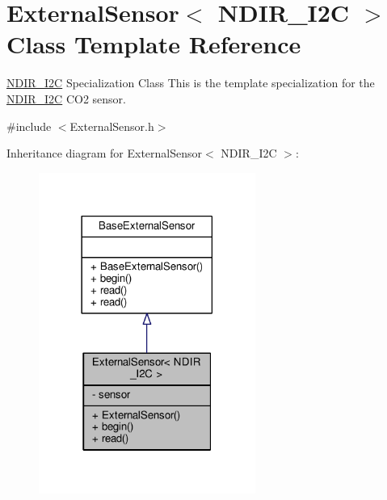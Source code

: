 \hypertarget{class_external_sensor_3_01_n_d_i_r___i2_c_01_4}{}\section{External\+Sensor$<$ N\+D\+I\+R\+\_\+\+I2C $>$ Class Template Reference}
\label{class_external_sensor_3_01_n_d_i_r___i2_c_01_4}


\hyperlink{class_n_d_i_r___i2_c}{N\+D\+I\+R\+\_\+\+I2C} Specialization Class This is the template specialization for the \hyperlink{class_n_d_i_r___i2_c}{N\+D\+I\+R\+\_\+\+I2C} C\+O2 sensor.  




{\ttfamily \#include $<$External\+Sensor.\+h$>$}



Inheritance diagram for External\+Sensor$<$ N\+D\+I\+R\+\_\+\+I2C $>$\+:
\nopagebreak
\begin{figure}[H]
\begin{center}
\leavevmode
\includegraphics[width=201pt]{class_external_sensor_3_01_n_d_i_r___i2_c_01_4__inherit__graph}
\end{center}
\end{figure}


